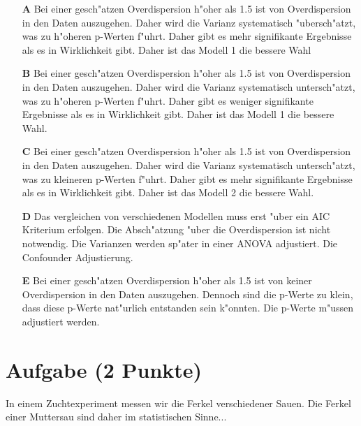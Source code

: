 \documentclass[a4paper, 10pt]{scrartcl}\usepackage[]{graphicx}\usepackage[]{xcolor}
\begin{document}
\begin{enumerate}
\item [\textbf{A} \msquare] Bei einer gesch{"a}tzen Overdispersion h{"o}her als 1.5 ist von Overdispersion in den Daten auszugehen. Daher wird die Varianz systematisch {"u}bersch{"a}tzt, was zu h{"o}heren p-Werten f{"u}hrt. Daher gibt es mehr signifikante Ergebnisse als es in Wirklichkeit gibt. Daher ist das Modell 1 die bessere Wahl
\item [\textbf{B} \msquare] Bei einer gesch{"a}tzen Overdispersion h{"o}her als 1.5 ist von Overdispersion in den Daten auszugehen. Daher wird die Varianz systematisch untersch{"a}tzt, was zu h{"o}heren p-Werten f{"u}hrt. Daher gibt es weniger signifikante Ergebnisse als es in Wirklichkeit gibt. Daher ist das Modell 1 die bessere Wahl.
\item [\textbf{C} \msquare] Bei einer gesch{"a}tzen Overdispersion h{"o}her als 1.5 ist von Overdispersion in den Daten auszugehen. Daher wird die Varianz systematisch untersch{"a}tzt, was zu kleineren p-Werten f{"u}hrt. Daher gibt es mehr signifikante Ergebnisse als es in Wirklichkeit gibt. Daher ist das Modell 2 die bessere Wahl.
\item [\textbf{D} \msquare] Das vergleichen von verschiedenen Modellen muss erst {"u}ber ein AIC Kriterium erfolgen. Die Absch{"a}tzung {"u}ber die Overdispersion ist nicht notwendig. Die Varianzen werden sp{"a}ter in einer ANOVA adjustiert. Die Confounder Adjustierung.
\item [\textbf{E} \msquare] Bei einer gesch{"a}tzen Overdispersion h{"o}her als 1.5 ist von keiner Overdispersion in den Daten auszugehen. Dennoch sind die p-Werte zu klein, dass diese p-Werte nat{"u}rlich entstanden sein k{"o}nnten. Die p-Werte m{"u}ssen adjustiert werden.
\end{enumerate}

\section{Aufgabe \hfill (2 Punkte)}

In einem Zuchtexperiment messen wir die Ferkel verschiedener Sauen. Die
Ferkel einer Muttersau sind daher im statistischen Sinne... 
\end{document}
